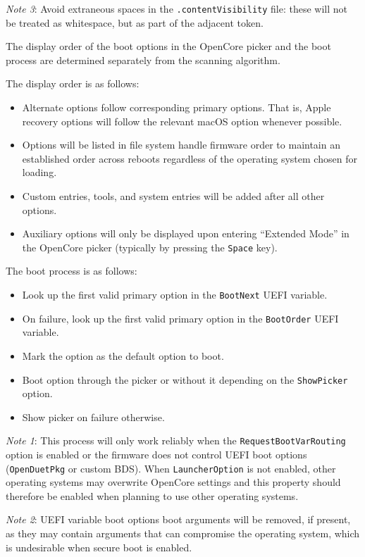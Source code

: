 \documentclass[]{article}
\providecommand{\tightlist}{%
  \setlength{\itemsep}{0pt}\setlength{\parskip}{0pt}}
\begin{document}
\emph{Note 3}: Avoid extraneous spaces in the \texttt{.contentVisibility} file: these will not be treated as
whitespace, but as part of the adjacent token.

The display order of the boot options in the OpenCore picker and the boot process
are determined separately from the scanning algorithm.

The display order is as follows:

\begin{itemize}
\tightlist
\item Alternate options follow corresponding primary options. That is, Apple recovery options will follow the
  relevant macOS option whenever possible.
\item Options will be listed in file system handle firmware order to maintain an established order across
  reboots regardless of the operating system chosen for loading.
\item Custom entries, tools, and system entries will be added after all other options.
\item Auxiliary options will only be displayed upon entering ``Extended Mode'' in the OpenCore picker
(typically by pressing the \texttt{Space} key).
\end{itemize}

The boot process is as follows:
\begin{itemize}
\tightlist
\item Look up the first valid primary option in the \texttt{BootNext} UEFI variable.
\item On failure, look up the first valid primary option in the \texttt{BootOrder} UEFI variable.
\item Mark the option as the default option to boot.
\item Boot option through the picker or without it depending on the \texttt{ShowPicker} option.
\item Show picker on failure otherwise.
\end{itemize}

\emph{Note 1}: This process will only work reliably when the \texttt{RequestBootVarRouting}
option is enabled or the firmware does not control UEFI boot options (\texttt{OpenDuetPkg} or
custom BDS). When \texttt{LauncherOption} is not enabled, other operating systems may
overwrite OpenCore settings and this property should therefore be enabled when planning
to use other operating systems.

\emph{Note 2}: UEFI variable boot options boot arguments will be removed, if present, as
they may contain arguments that can compromise the operating system, which is undesirable
when secure boot is enabled.
\end{document}
